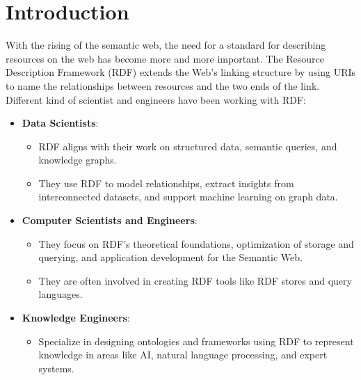 \chapter{Introduction\label{cha:chapter1}}

With the rising of the semantic web, the need for a standard for describing resources on the web has become more and more important. 
The Resource Description Framework (RDF) extends the Web’s linking structure by using URIs to name the relationships between resources and the two ends of the link. 
Different kind of scientist and engineers have been working with RDF:

\begin{itemize}
  \item \textbf{Data Scientists}:
  \begin{itemize}
      \item RDF aligns with their work on structured data, semantic queries, and knowledge graphs.
      \item They use RDF to model relationships, extract insights from interconnected datasets, and support machine learning on graph data.
  \end{itemize}
  
  \item \textbf{Computer Scientists and Engineers}:
  \begin{itemize}
      \item They focus on RDF’s theoretical foundations, optimization of storage and querying, and application development for the Semantic Web.
      \item They are often involved in creating RDF tools like RDF stores and query languages.
  \end{itemize}
  
  \item \textbf{Knowledge Engineers}:
  \begin{itemize}
      \item Specialize in designing ontologies and frameworks using RDF to represent knowledge in areas like AI, natural language processing, and expert systems.
  \end{itemize}
\end{itemize}

